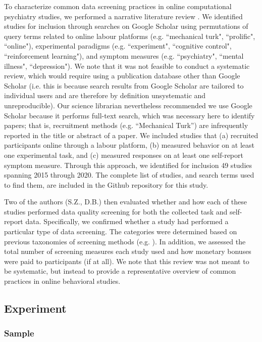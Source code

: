 \documentclass[a4paper,notitlepage,12pt]{article}
\begin{document}
\begin{refsection}[main]
To characterize common data screening practices in online computational psychiatry studies, we performed a narrative literature review \cite{grant2009typology}. We identified studies for inclusion through searches on Google Scholar using permutations of query terms related to online labour platforms (e.g. ``mechanical turk", ``prolific", ``online"), experimental paradigms (e.g. ``experiment", ``cognitive control", ``reinforcement learning"), and symptom measures (e.g. ``psychiatry", ``mental illness", ``depression"). We note that it was not feasible to conduct a systematic review, which would require using a publication database other than Google Scholar (i.e. this is because search results from Google Scholar are tailored to individual users and are therefore by definition unsystematic and unreproducible). Our science librarian nevertheless recommended we use Google Scholar because it performs full-text search, which was necessary here to identify papers; that is, recruitment methods (e.g. ``Mechanical Turk'') are infrequently reported in the title or abstract of a paper. We included studies that (a) recruited participants online through a labour platform, (b) measured behavior on at least one experimental task, and (c) measured responses on at least one self-report symptom measure. Through this approach, we identified for inclusion 49 studies spanning 2015 through 2020. The complete list of studies, and search terms used to find them, are included in the Github repository for this study. 

Two of the authors (S.Z., D.B.) then evaluated whether and how each of these studies performed data quality screening for both the collected task and self-report data. Specifically, we confirmed whether a study had performed a particular type of data screening. The categories were determined based on previous taxonomies of screening methods (e.g. \cite{curran2016methods}). In addition, we assessed the total number of screening measures each study used and how monetary bonuses were paid to participants (if at all). We note that this review was not meant to be systematic, but instead to provide a representative overview of common practices in online behavioral studies.

\subsection{Experiment}

\subsubsection{Sample}


\end{refsection}
\end{document}
